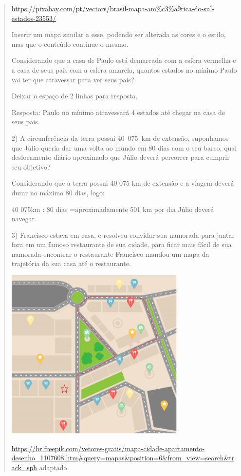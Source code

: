 \begin{quote}
\begin{escolha}
\url{https://pixabay.com/pt/vectors/brasil-mapa-am\%c3\%a9rica-do-sul-estados-23553/}

Inserir um mapa similar a esse, podendo ser alterada as cores e o
estilo, mas que o conteúdo continue o mesmo.

Considerando que a casa de Paulo está demarcada com a esfera vermelha e
a casa de seus pais com a esfera amarela, quantos estados no mínimo
Paulo vai ter que atravessar para ver seus pais?

Deixar o espaço de 2 linhas para resposta.

Resposta: Paulo no mínimo atravessará 4 estados até chegar na casa de
seus pais.

2) A circunferência da terra possui 40~075~km de extensão, suponhamos
que Júlio queria dar uma volta ao mundo em 80 dias com o seu barco, qual
deslocamento diário aproximado que Júlio deverá percorrer para cumprir
seu objetivo?

Considerando que a terra possui 40 075 km de extensão e a viagem deverá
durar no máximo 80 dias, logo:

40 075km : 80 dias =aproximadamente 501 km por dia Júlio deverá navegar.

3) Francisco estava em casa, e resolveu convidar sua namorada para
jantar fora em um famoso restaurante de sua cidade, para ficar mais
fácil de sua namorada encontrar o restaurante Francisco mandou um mapa
da trajetória da sua casa até o restaurante.

\includegraphics[width=3.55in,height=3.406in]{./imgSAEB_8_MAT/media/image37.png}

\url{https://br.freepik.com/vetores-gratis/mapa-cidade-apartamento-desenho_1107608.htm\#query=mapas\&position=6\&from_view=search\&track=sph}
adaptado.


\end{escolha}
\end{quote}
